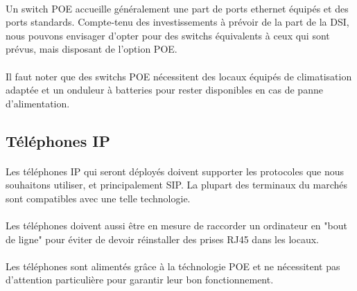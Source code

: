 \paragraph{} Un switch POE accueille généralement une part de ports ethernet
équipés et des ports standards. Compte-tenu des investissements à prévoir de la
part de la DSI, nous pouvons envisager d'opter pour des switchs équivalents à
ceux qui sont prévus, mais disposant de l'option POE.

\paragraph{} Il faut noter que des switchs POE nécessitent des locaux équipés de
climatisation adaptée et un onduleur à batteries pour rester disponibles en cas
de panne d'alimentation.

\subsection{Téléphones IP}

\paragraph{} Les téléphones IP qui seront déployés doivent supporter les
protocoles que nous souhaitons utiliser, et principalement \ac{SIP}. La plupart
des terminaux du marchés sont compatibles avec une telle technologie.

\paragraph{} Les téléphones doivent aussi être en mesure de raccorder un
ordinateur en "bout de ligne" pour éviter de devoir réinstaller des prises RJ45
dans les locaux.

\paragraph{} Les téléphones sont alimentés grâce à la téchnologie \ac{POE} et ne
nécessitent pas d'attention particulière pour garantir leur bon fonctionnement.
